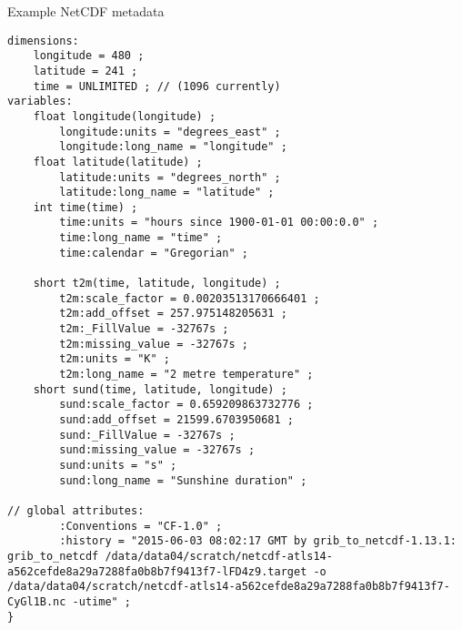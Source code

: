 \begin{tcbcode}[label={lst:NetCDF-data}]{Example NetCDF metadata}
\begin{lstlisting}
dimensions:
	longitude = 480 ;
	latitude = 241 ;
	time = UNLIMITED ; // (1096 currently)
variables:
	float longitude(longitude) ;
		longitude:units = "degrees_east" ;
		longitude:long_name = "longitude" ;
	float latitude(latitude) ;
		latitude:units = "degrees_north" ;
		latitude:long_name = "latitude" ;
	int time(time) ;
		time:units = "hours since 1900-01-01 00:00:0.0" ;
		time:long_name = "time" ;
		time:calendar = "Gregorian" ;

	short t2m(time, latitude, longitude) ;
		t2m:scale_factor = 0.00203513170666401 ;
		t2m:add_offset = 257.975148205631 ;
		t2m:_FillValue = -32767s ;
		t2m:missing_value = -32767s ;
		t2m:units = "K" ;
		t2m:long_name = "2 metre temperature" ;
	short sund(time, latitude, longitude) ;
		sund:scale_factor = 0.659209863732776 ;
		sund:add_offset = 21599.6703950681 ;
		sund:_FillValue = -32767s ;
		sund:missing_value = -32767s ;
		sund:units = "s" ;
		sund:long_name = "Sunshine duration" ;

// global attributes:
		:Conventions = "CF-1.0" ;
		:history = "2015-06-03 08:02:17 GMT by grib_to_netcdf-1.13.1: grib_to_netcdf /data/data04/scratch/netcdf-atls14-a562cefde8a29a7288fa0b8b7f9413f7-lFD4z9.target -o /data/data04/scratch/netcdf-atls14-a562cefde8a29a7288fa0b8b7f9413f7-CyGl1B.nc -utime" ;
}
\end{lstlisting}
\end{tcbcode}


